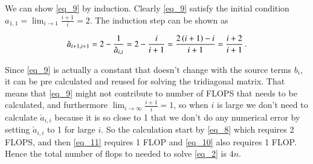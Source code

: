 \documentclass[11pt,english,a4paper]{article}
\begin{document}
\begin{flushleft}
We can show \eqref{eq_9} by induction. Clearly \eqref{eq_9} satisfy the initial condition $a_{1,1} = \lim_{i\to 1} \frac{i+1}{i} = 2$. The induction step can be shown as 

\begin{align*}
\check a_{i+1,i+1} = 2 - \frac{1}{\check a_{i,i}} = 2 - \frac{i}{i+1} = \frac{2\left({i+1}\right)-i}{i+1} = \frac{i+2}{i+1} \,.
\end{align*}

Since \eqref{eq_9} is actually a constant that doesn't change with the source terms $b_i$, it can be pre calculated and reused for solving the tridiagonal matrix. That means that \eqref{eq_9} might not contribute to number of FLOPS that needs to be calculated, and furthermore $\lim_{i\to \infty} \frac{i+1}{i} = 1$, so when $i$ is large we don't need to calculate $\check a_{i,i}$ because it is so close to 1 that we don't do any numerical error by setting $\check a_{i,i}$ to 1 for large $i$. So the calculation start by  \eqref{eq_8} which requires 2 FLOPS, and then \eqref{eq_11} requires 1 FLOP and \eqref{eq_10} also requires 1 FLOP. Hence the total number of flops to needed to solve \eqref{eq_2} is $4n$.

\end{flushleft}
\end{document}
